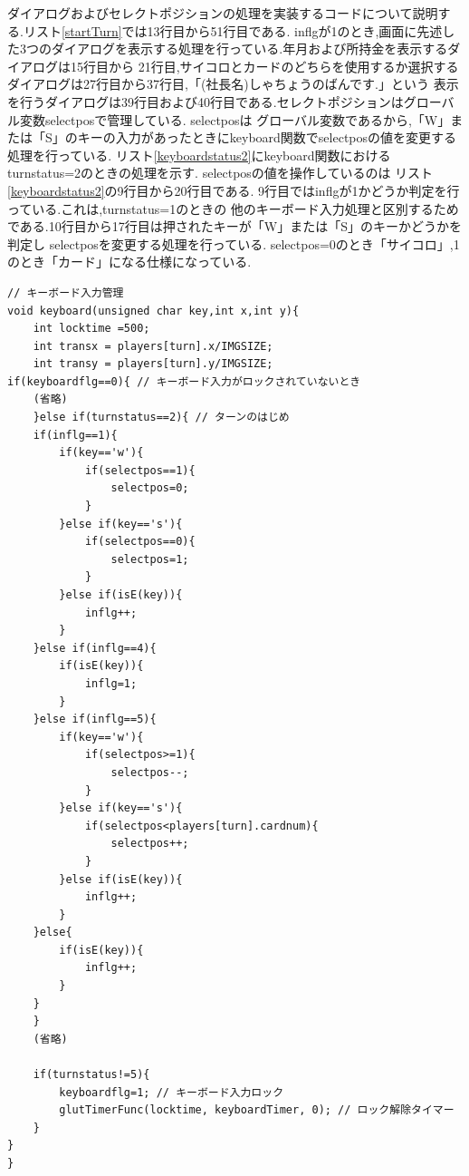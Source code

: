 \documentclass[a4j]{jarticle}
\begin{document}
        ダイアログおよびセレクトポジションの処理を実装するコードについて説明する.リスト\ref{startTurn}では13行目から51行目である.
        inflgが1のとき,画面に先述した3つのダイアログを表示する処理を行っている.年月および所持金を表示するダイアログは15行目から
        21行目,サイコロとカードのどちらを使用するか選択するダイアログは27行目から37行目,「(社長名)しゃちょうのばんです.」という
        表示を行うダイアログは39行目および40行目である.セレクトポジションはグローバル変数selectposで管理している. selectposは
        グローバル変数であるから,「W」または「S」のキーの入力があったときにkeyboard関数でselectposの値を変更する処理を行っている.
        リスト\ref{keyboardstatus2}にkeyboard関数におけるturnstatus=2のときの処理を示す. selectposの値を操作しているのは
        リスト\ref{keyboardstatus2}の9行目から20行目である. 9行目ではinflgが1かどうか判定を行っている.これは,turnstatus=1のときの
        他のキーボード入力処理と区別するためである.10行目から17行目は押されたキーが「W」または「S」のキーかどうかを判定し
        selectposを変更する処理を行っている. selectpos=0のとき「サイコロ」,1のとき「カード」になる仕様になっている.
        \begin{lstlisting}[basicstyle=\ttfamily\footnotesize, frame=single,label=keyboardstatus2,caption=ターンのはじめのキーボード入力の処理]
// キーボード入力管理
void keyboard(unsigned char key,int x,int y){
    int locktime =500;
    int transx = players[turn].x/IMGSIZE;
    int transy = players[turn].y/IMGSIZE;
if(keyboardflg==0){ // キーボード入力がロックされていないとき
    (省略)
    }else if(turnstatus==2){ // ターンのはじめ
    if(inflg==1){
        if(key=='w'){
            if(selectpos==1){
                selectpos=0;
            }   
        }else if(key=='s'){
            if(selectpos==0){
                selectpos=1;
            }
        }else if(isE(key)){
            inflg++;
        }
    }else if(inflg==4){
        if(isE(key)){
            inflg=1;
        }        
    }else if(inflg==5){
        if(key=='w'){
            if(selectpos>=1){
                selectpos--;
            }   
        }else if(key=='s'){
            if(selectpos<players[turn].cardnum){
                selectpos++;
            }
        }else if(isE(key)){
            inflg++;
        }        
    }else{
        if(isE(key)){
            inflg++;
        }        
    }
    }
    (省略)

    if(turnstatus!=5){
        keyboardflg=1; // キーボード入力ロック
        glutTimerFunc(locktime, keyboardTimer, 0); // ロック解除タイマー
    }
}
}
        \end{lstlisting}   
\end{document}
